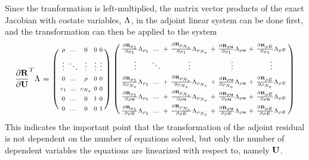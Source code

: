 Since the tranformation is left-multiplied, the matrix vector products of the 
exact Jacobian with costate variables, $\Lambda_{}$, in the adjoint linear system
can be done first, and the transformation can then be applied to the system
\begin{equation}
  \begin{aligned}
    \frac{\partial \mathbf R}{\partial \mathbf U}^{T} \Lambda_{} =
    \left(
    \begin{smallmatrix}
      \rho   & \dots  & 0      &  0      & 0      \\ \\
      \vdots & \ddots & \vdots &  \vdots & \vdots \\ \\
      0      & \dots  &\rho    &  0      & 0      \\ \\
      c_1    & \dots  & c_{N_s} &  0      & 0      \\ \\
      0      & \dots  & 0      &  1      & 0      \\ \\
      0      & \dots  & 0      &  0      & 1
    \end{smallmatrix}
    \right)
    \left(
    \begin{smallmatrix}
      \frac{\partial \mathbf R_{\rho_1}}{\partial \rho_1} \Lambda_{\rho_1}    & \dots  &+& \frac{\partial \mathbf R_{\rho_{N_s}}}{\partial \rho_1} \Lambda_{\rho_{N_s}}    &+& \frac{\partial \mathbf R_{\rho \mathbf u}}{\partial \rho_1} \Lambda_{\rho \mathbf u}    &+& \frac{\partial \mathbf R_{\rho E}}{\partial \rho_1} \Lambda_{\rho E} \\ \\
      \vdots                     & \ddots & & \vdots                        & & \vdots                       & & \vdots                   \\ \\
      \frac{\partial \mathbf R_{\rho_1}}{\partial \rho_{N_s}} \Lambda_{\rho_1} & \dots  &+& \frac{\partial \mathbf R_{\rho_{N_s}}}{\partial \rho_{N_s}} \Lambda_{\rho_{N_s}} &+& \frac{\partial \mathbf R_{\rho \mathbf u}}{\partial \rho_{N_s}} \Lambda_{\rho \mathbf u} &+& \frac{\partial \mathbf R_{\rho E}}{\partial \rho_{N_s}} \Lambda_{\rho E} \\ \\
      \frac{\partial \mathbf R_{\rho_1}}{\partial \rho \mathbf u} \Lambda_{\rho_1}  & \dots  &+& \frac{\partial \mathbf R_{\rho_{N_s}}}{\partial \rho \mathbf u} \Lambda_{\rho_{N_s}}  &+& \frac{\partial \mathbf R_{\rho \mathbf u}}{\partial \rho \mathbf u} \Lambda_{\rho \mathbf u}  &+& \frac{\partial \mathbf R_{\rho E}}{\partial \rho \mathbf u} \Lambda_{\rho E} \\ \\
      \frac{\partial \mathbf R_{\rho_1}}{\partial \rho E} \Lambda_{\rho_1}    & \dots  &+& \frac{\partial \mathbf R_{\rho_{N_s}}}{\partial \rho E} \Lambda_{\rho_{N_s}}    &+& \frac{\partial \mathbf R_{\rho \mathbf u}}{\partial \rho E} \Lambda_{\rho \mathbf u}    &+& \frac{\partial \mathbf R_{\rho E}}{\partial \rho E} \Lambda_{\rho E}
    \end{smallmatrix}
    \right)
  \end{aligned}
  \label{adj-drdv}
\end{equation}
This indicates the important point that the transformation of the adjoint
residual is not dependent on the number of equations solved, but only the number
of dependent variables the equations are linearized with respect to, namely
$\mathbf U$.
